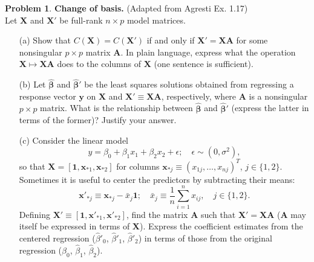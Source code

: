 \documentclass[11pt,letterpaper,english,oneside]{article} %
\theoremstyle{definition} %
\newtheorem{problem}{Problem}
\newenvironment{prob}{\clearpage \begin{problem}\hspace{0pt}}{\end{problem}}
\begin{document}
\begin{prob} \label{prob:change-of-basis}\textbf{Change of basis.} (Adapted from Agresti Ex. 1.17) \\

\noindent Let $\bm X$ and $\bm X'$ be full-rank $n \times p$ model matrices.
\begin{enumerate}
\item[(a)]  Show that $C(\bm X) = C(\bm X')$ if and only if $\bm X' = \bm X \bm A$ for some nonsingular $p \times p$ matrix $\bm A$. In plain language, express what the operation $\bm X \mapsto \bm X \bm A$ does to the columns of $\bm X$ (one sentence is sufficient).
\item[(b)] Let $\bm{\widehat \beta}$ and $\bm{\widehat \beta'}$ be the least squares solutions obtained from regressing a response vector $\bm y$ on $\bm X$ and $\bm X' \equiv \bm X \bm A$, respectively, where $\bm A$ is a nonsingular $p \times p$ matrix. What is the relationship between $\bm{\widehat \beta}$ and $\bm{\widehat \beta'}$ (express the latter in terms of the former)? Justify your answer. 
\item[(c)] Consider the linear model
\begin{equation}
y = \beta_0 + \beta_1 x_1 + \beta_2 x_2 + \epsilon; \quad \epsilon \sim (0, \sigma^2),
\label{eq:two-predictors}
\end{equation}
so that $\bm X = [\bm 1, \bm x_{*1}, \bm x_{*2}]$ for columns $\bm x_{*j} \equiv (x_{1j}, \dots, x_{nj})^T$, $j \in \{1,2\}$. Sometimes it is useful to center the predictors by subtracting their means: 
\begin{equation*}
\bm x'_{*j} \equiv \bm x_{*j} - \bar x_j \bm 1; \quad \bar x_j \equiv \frac{1}{n}\sum_{i = 1}^n x_{ij}, \quad j \in \{1,2\}.
\end{equation*}
Defining $\bm X' \equiv [\bm 1, \bm x'_{*1}, \bm x'_{*2}]$, find the matrix $\bm A$ such that $\bm X' = \bm X \bm A$ ($\bm A$ may itself be expressed in terms of $\bm X$). Express the coefficient estimates from the centered regression ($\widehat \beta'_0$, $\widehat \beta'_1$, $\widehat \beta'_2$) in terms of those from the original regression ($\widehat \beta_0$, $\widehat \beta_1$, $\widehat \beta_2$).

\end{enumerate}
\end{prob}
\end{document}
